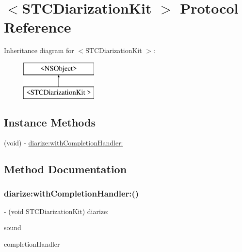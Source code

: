 \hypertarget{protocol_s_t_c_diarization_kit_01-p}{}\section{$<$S\+T\+C\+Diarization\+Kit $>$ Protocol Reference}
\label{protocol_s_t_c_diarization_kit_01-p}
Inheritance diagram for $<$S\+T\+C\+Diarization\+Kit $>$\+:\begin{figure}[H]
\begin{center}
\leavevmode
\includegraphics[height=2.000000cm]{protocol_s_t_c_diarization_kit_01-p}
\end{center}
\end{figure}
\subsection*{Instance Methods}
\begin{DoxyCompactItemize}
\item 
(void) -\/ \hyperlink{protocol_s_t_c_diarization_kit_01-p_a1d28a960422b37cbd5be63c0342de91e}{diarize\+:with\+Completion\+Handler\+:}
\end{DoxyCompactItemize}


\subsection{Method Documentation}
\hypertarget{protocol_s_t_c_diarization_kit_01-p_a1d28a960422b37cbd5be63c0342de91e}{}\label{protocol_s_t_c_diarization_kit_01-p_a1d28a960422b37cbd5be63c0342de91e} 
\subsubsection{\texorpdfstring{diarize\+:with\+Completion\+Handler\+:()}{diarize:withCompletionHandler:()}}
{\footnotesize\ttfamily -\/ (void S\+T\+C\+Diarization\+Kit) diarize\+: \begin{DoxyParamCaption}\item[{(N\+S\+Data $\ast$)}]{sound }\item[{withCompletionHandler:(Diarization\+Completion\+Handler)}]{completion\+Handler }\end{DoxyParamCaption}}

